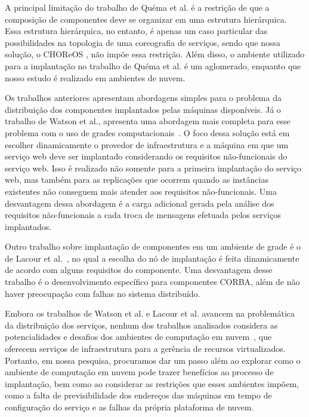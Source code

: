 A principal limitação do trabalho de Quéma et al. é a restrição de que a composição de componentes deve se organizar em uma estrutura hierárquica. Essa estrutura hierárquica, no entanto, é apenas um caso particular das possibilidades na topologia de uma coreografia de serviços, sendo que nossa solução, o CHOReOS \ee, não impõe essa restrição. Além disso, o ambiente utilizado para a implantação no trabalho de Quéma et al. é um aglomerado, enquanto que nosso estudo é realizado em ambientes de nuvem.

Os trabalhos anteriores apresentam abordagens simples para o problema da distribuição dos componentes implantados pelas máquinas disponíveis. Já o trabalho de Watson et al., apresenta uma abordagem mais completa para esse problema com o uso de grades computacionais~\cite{Watson2006Dynasoar}. O foco dessa solução está em escolher dinamicamente o provedor de infraestrutura e a máquina em que um serviço web deve ser implantado considerando os requisitos não-funcionais do serviço web. Isso é realizado não somente para a primeira implantação do serviço web, mas também para as replicações que ocorrem quando as instâncias existentes não conseguem mais atender aos requisitos não-funcionais. Uma desvantagem dessa abordagem é a carga adicional gerada pela análise dos requisitos não-funcionais a cada troca de mensagens efetuada pelos serviços implantados. 

Outro trabalho sobre implantação de componentes em um ambiente de grade é o de Lacour et al.~\cite{Lacour2004Corba}, no qual a escolha do nó de implantação é feita dinamicamente de acordo com alguns requisitos do componente. Uma desvantagem desse trabalho é o desenvolvimento específico para componentes CORBA, além de não haver preocupação com falhas no sistema distribuído.

Embora os trabalhos de Watson et al. e Lacour et al. avancem na problemática da distribuição dos serviços, nenhum dos trabalhos analisados considera as potencialidades e desafios dos ambientes de computação em nuvem~\cite{Amazon2012Practices}, que oferecem serviços de infraestrutura para a gerência de recursos virtualizados. Portanto, em nossa pesquisa, procuramos dar um passo além ao explorar como o ambiente de computação em nuvem pode trazer benefícios ao processo de implantação, bem como ao considerar as restrições que esses ambientes impõem, como a falta de previsibilidade dos endereços das máquinas em tempo de configuração do serviço e as falhas da própria plataforma de nuvem.

